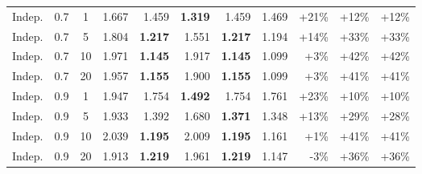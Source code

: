 \begin{table}[t]
\begin{tabular}{lcc | rrrrr | rrr}
    Indep. & 0.7 & 1 & 1.667 & 1.459 & \textbf{1.319} & 1.459 & 1.469 & +21\% & +12\% & +12\% \\
    Indep. & 0.7 & 5 & 1.804 & \textbf{1.217} & 1.551 & \textbf{1.217} & 1.194 & +14\% & +33\% & +33\% \\
    Indep. & 0.7 & 10 & 1.971 & \textbf{1.145} & 1.917 & \textbf{1.145} & 1.099 & +3\% & +42\% & +42\% \\
    Indep. & 0.7 & 20 & 1.957 & \textbf{1.155} & 1.900 & \textbf{1.155} & 1.099 & +3\% & +41\% & +41\% \\
    Indep. & 0.9 & 1 & 1.947 & 1.754 & \textbf{1.492} & 1.754 & 1.761 & +23\% & +10\% & +10\% \\
    Indep. & 0.9 & 5 & 1.933 & 1.392 & 1.680 & \textbf{1.371} & 1.348 & +13\% & +29\% & +28\% \\
    Indep. & 0.9 & 10 & 2.039 & \textbf{1.195} & 2.009 & \textbf{1.195} & 1.161 & +1\% & +41\% & +41\% \\
    Indep. & 0.9 & 20 & 1.913 & \textbf{1.219} & 1.961 & \textbf{1.219} & 1.147 & -3\% & +36\% & +36\% \\
    \bottomrule
  \end{tabular}
\end{table}
